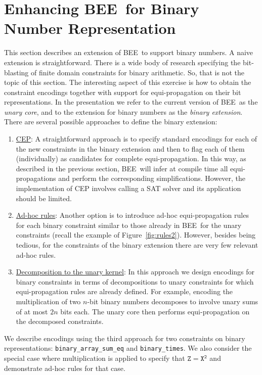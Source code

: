 \documentclass[runningheads,a4paper]{llncs}
\newcommand{\bee}{\textsf{BEE}}
\begin{document}
\section{Enhancing \bee\ for Binary Number Representation}

This section describes an extension of \bee\ to support binary
numbers.  A naive extension is straightforward. There is a wide body
of research specifying the bit-blasting of finite domain constraints
for binary arithmetic. So, that is not the topic of this section.  The
interesting aspect of this exercise is how to obtain the constraint
encodings together with support for equi-propagation on their bit
representations. In the presentation we refer to the current version
of \bee\ as the \emph{unary core}, and to the extension for binary
numbers as the \emph{binary extension}.  There are several
possible approaches to define the binary extension:
\begin{enumerate}
\item \underline{CEP}: A straightforward approach is to specify
  standard encodings for each of the new constraints in the binary
  extension and then to flag each of them (individually) as candidates
  for complete equi-propagation. In this way, as described in the
  previous section, \bee\ will infer at compile time all
  equi-propagations and perform the corresponding simplifications.
However, the implementation of CEP involves calling a SAT solver and
  its application should be limited.

\item \underline{Ad-hoc rules}: Another option is to introduce ad-hoc
  equi-propagation rules for each binary constraint similar to those
  already in \bee\ for the unary constraints (recall the example of
  Figure~\ref{fig:rules2}).
However, besides being tedious, for the constraints of the binary
  extension there are very few relevant ad-hoc rules.

\item \underline{Decomposition to the unary kernel}: In this approach
  we design encodings for binary constraints in terms of
  decompositions to unary constraints for which equi-propagation rules
  are already defined.
For example, encoding the multiplication of two $n$-bit binary
  numbers decomposes to involve unary sums of at most $2n$ bits
  each. The unary core then performs equi-propagation on the
  decomposed constraints.

\end{enumerate}

We describe encodings using the third approach for two constraints on
binary representations: \texttt{binary\_array\_sum\_eq} and
\texttt{binary\_times}. 
We also consider the special case where multiplication is applied to
specify that $\mathtt{Z=X^2}$ and demonstrate ad-hoc rules for that
case.
\end{document}
